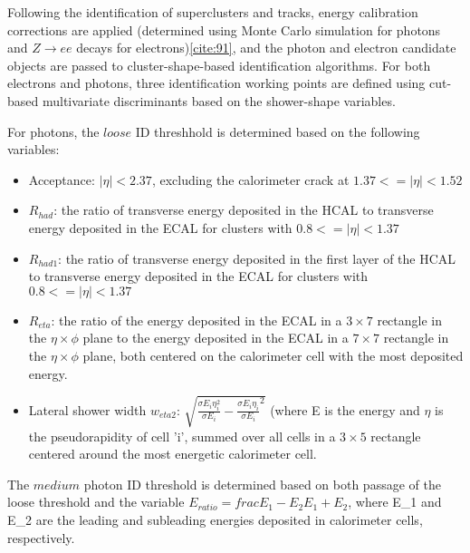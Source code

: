 Following the identification of superclusters and tracks, energy calibration corrections are applied (determined using Monte Carlo simulation for photons and $Z \rightarrow ee$ decays for electrons)\ref{cite:91}, and the photon and electron candidate objects are passed to cluster-shape-based identification algorithms. For both electrons and photons, three identification working points are defined using cut-based multivariate discriminants based on the shower-shape variables.

For photons, the $loose$ ID threshhold is determined based on the following variables:
\begin{itemize}
  \item Acceptance: $|\eta|<2.37$, excluding the calorimeter crack at $1.37 <= |\eta|<1.52$  
  \item $R_{had}$: the ratio of transverse energy deposited in the HCAL to transverse energy deposited in the ECAL for clusters with $0.8 <= |\eta|<1.37$ 
  \item $R_{had1}$: the ratio of transverse energy deposited in the first layer of the HCAL to transverse energy deposited in the ECAL for clusters with $0.8 <= |\eta|<1.37$ 
  \item $R_{eta}$: the ratio of the energy deposited in the ECAL in a $3 \times 7$ rectangle in the $\eta \times \phi$ plane to the energy deposited in the ECAL in a $7 \times 7$ rectangle in the $\eta \times \phi$ plane, both centered on the calorimeter cell with the most deposited energy. 
   \item Lateral shower width $w_{eta2}$: $\sqrt{\frac{\sigma E_{i} \eta_{i}^{2}}{\sigma E_{i}}-{\frac{\sigma E_{i} \eta_{i}}{\sigma E_{i}}}^2}$ (where E is the energy and $\eta$ is the pseudorapidity of cell 'i', summed over all cells in a $3 \times 5$ rectangle centered around the most energetic calorimeter cell. 
\end{itemize}

The $medium$ photon ID threshold is determined based on both passage of the loose threshold and the variable $E_{ratio} = frac{E_{1}-E_{2}}{E_{1}+E_{2}}$, where E_{1} and E_{2} are the leading and subleading energies deposited in calorimeter cells, respectively.

